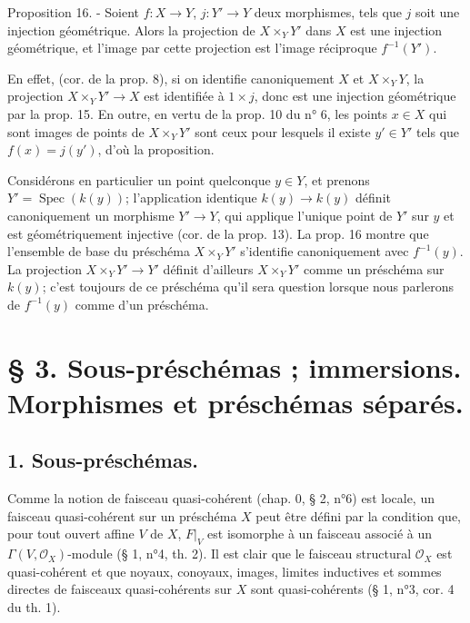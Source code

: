 Proposition 16. - Soient $f : X \to Y$, $j : Y' \to Y$ deux morphismes, tels que $j$ soit une injection géométrique. Alors la projection de $X \times_Y Y'$ dans $X$ est une injection géométrique, et l'image par cette projection est l'image réciproque $f^{-1}(Y')$.

En effet, (cor. de la prop. 8), si on identifie canoniquement $X$ et $X \times_Y Y$, la projection $X \times_Y Y' \to X$ est identifiée à $1 \times j$, donc est une injection géométrique par la prop. 15. En outre, en vertu de la prop. 10 du n° 6, les points $x \in X$ qui sont images de points de $X \times_Y Y'$ sont ceux pour lesquels il existe $y' \in Y'$ tels que $f(x) = j(y')$, d'où la proposition.

Considérons en particulier un point quelconque $y \in Y$, et prenons $Y' = \operatorname{Spec}(k(y))$; l'application identique $k(y) \to k(y)$ définit canoniquement un morphisme $Y' \to Y$, qui applique l'unique point de $Y'$ sur $y$ et est géométriquement injective (cor. de la prop. 13). La prop. 16 montre que l'ensemble de base du préschéma $X \times_Y Y'$ s'identifie canoniquement avec $f^{-1}(y)$. La projection $X \times_Y Y' \to Y'$ définit d'ailleurs $X \times_Y Y'$ comme un préschéma sur $k(y)$; c'est toujours de ce préschéma qu'il sera question lorsque nous parlerons de $f^{-1}(y)$ comme d'un préschéma.

\newpage



\section*{§ 3. Sous-préschémas ; immersions. Morphismes et préschémas séparés.}

\subsection*{1. Sous-préschémas.}

Comme la notion de faisceau quasi-cohérent (chap. 0, § 2, n°6) est locale, un faisceau quasi-cohérent sur un préschéma $X$ peut être défini par la condition que, pour tout ouvert affine $V$ de $X$, $F|_V$ est isomorphe à un faisceau associé à un $\Gamma(V, \mathcal{O}_X)$-module (§ 1, n°4, th. 2). Il est clair que le faisceau structural $\mathcal{O}_X$ est quasi-cohérent et que noyaux, conoyaux, images, limites inductives et sommes directes de faisceaux quasi-cohérents sur $X$ sont quasi-cohérents (§ 1, n°3, cor. 4 du th. 1).

